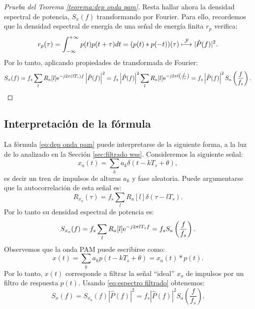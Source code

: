 \begin{proof}[Prueba del Teorema \ref{teorema:dep onda pam}]
Resta hallar ahora la densidad espectral de potencia, $S_x(f)$ transformando por Fourier. Para ello, recordemos que la densidad espectral de energía de una señal de energía finita $r_p$ verifica:
\begin{equation*}
    r_p(\tau) = \int_{-\infty}^{+\infty} p(t) p(t + \tau)dt  = (p(t)*p(-t))(\tau) \;\displaystyle{\mathop{\longmapsto}^{\mathcal{F}}}\; |\hat{P}(f)|^2.
\end{equation*}
Por lo tanto, aplicando propiedades de transformada de Fourier:
\begin{equation*}
    S_x(f) = f_s \sum_l R_a[l] \mathrm{e}^{-j2\pi(lT_s)f} \left|\hat{P}(f)\right|^2 = f_s \left|\hat{P}(f)\right|^2\sum_l R_a[l] \mathrm{e}^{-j2\pi l
        \left(\frac{f}{f_s}\right)} = f_s \left|\hat{P}(f)\right|^2 S_a\left(\frac{f}{f_s}\right).
\end{equation*}
\end{proof}

\subsection{Interpretación de la fórmula}

La fórmula \eqref{eq:dep onda pam} puede interpretarse de la siguiente forma, a la luz de lo analizado en la Sección \ref{sec:filtrado wss}. Consideremos la siguiente señal:
\begin{equation*}
    x_a(t) = \sum_k a_k \delta(t-kT_s+\theta),
\end{equation*}
es decir un tren de impulsos de alturas $a_k$ y fase aleatoria. Puede argumentarse que la autocorrelación de esta señal es:
\begin{equation*}
    R_{x_a}(\tau) = f_s \sum_l R_a[l] \delta(\tau-lT_s).
\end{equation*}
Por lo tanto su densidad espectral de potencia es:
\begin{equation*}
    S_{x_a}(f) = f_s \sum_l R_a[l] \mathrm{e}^{-j2\pi l T_s f} = f_s S_a\left(\frac{f}{f_s}\right).
\end{equation*}
Observemos que la onda PAM puede escribirse como:
\begin{equation*}
    x(t) = \sum_k a_k p(t-kT_s + \theta) = x_a(t) * p(t).
\end{equation*}
Por lo tanto, $x(t)$ corresponde a filtrar la señal ``ideal'' $x_a$ de impulsos por un filtro de respuesta $p(t)$. Usando \eqref{eq:espectro filtrado} obtenemos:
\begin{equation*}
    S_x(f) = S_{x_a}(f) |\hat{P}(f)|^2 = f_s |\hat{P}(f)|^2 S_a\left(\frac{f}{f_s}\right).
\end{equation*}

